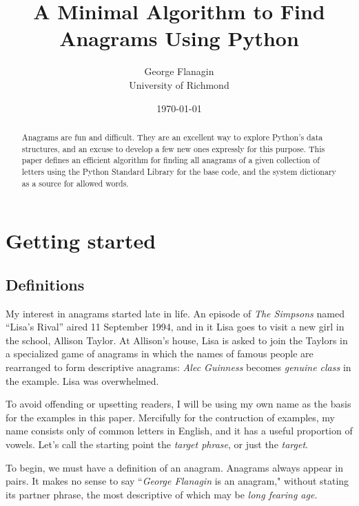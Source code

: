 \documentclass[letterpaper, 11pt]{article}
\title{A Minimal Algorithm to Find Anagrams Using Python}
\author{George Flanagin\\University of Richmond\\\lit{gflanagin@richmond.edu}}
\date{\today}
\begin{document}
\maketitle
\begin{abstract}
Anagrams are fun and difficult. They are an excellent way to explore
Python's data structures, and an excuse to develop a few new ones
expressly for this purpose. This paper defines an efficient algorithm
for finding all anagrams of a given collection of letters using the
Python Standard Library for the base code, and the system dictionary
as a source for allowed words.

\end{abstract}

\tableofcontents
\listoffigures

\newpage
\pagewiselinenumbers
\section{Getting started}

\subsection{Definitions}
My interest in anagrams started late in life. An episode of
\emph{The Simpsons} named ``Lisa's Rival'' aired 11 September 1994,
and in it Lisa goes to visit a new girl in the school, Allison
Taylor. At Allison's house, Lisa is asked to join the Taylors in a
specialized game of anagrams in which the names of famous people
are rearranged to form descriptive anagrams: \emph{Alec Guinness}
becomes \emph{genuine class} in the example.  Lisa was overwhelmed.

To avoid offending or upsetting readers, I will be using my own
name as the basis for the examples in this paper. Mercifully for
the contruction of examples, my name consists only of common letters
in English, and it has a useful proportion of vowels. Let's call
the starting point the \emph{target phrase}, or just the \emph{target}.

To begin, we must have a definition of an anagram. Anagrams
always appear in pairs.  It makes no sense to say ``\emph{George
Flanagin} is an anagram," without stating its partner phrase, the
most descriptive of which may be \emph{long fearing age}. 
\end{document}
